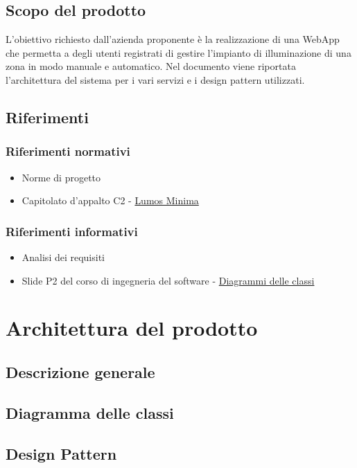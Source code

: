 \documentclass[12pt]{article}
\begin{document}
\subsection{Scopo del prodotto}
L'obiettivo richiesto dall'azienda proponente è la realizzazione di una WebApp che permetta a degli utenti registrati di gestire l'impianto di illuminazione
di una zona in modo manuale e automatico. Nel documento viene riportata l'architettura del sistema per i vari servizi e i design pattern utilizzati.

\subsection{Riferimenti}
\subsubsection{Riferimenti normativi}
\begin{itemize}
	\item Norme di progetto
	\item Capitolato d'appalto C2 - \href{https://www.math.unipd.it/~tullio/IS-1/2022/Progetto/C2.pdf}{Lumos Minima}
\end{itemize}
\subsubsection{Riferimenti informativi}
\begin{itemize}
	\item Analisi dei requisiti
	\item Slide P2 del corso di ingegneria del software - \href{https://www.math.unipd.it/~rcardin/swea/2023/Diagrammi%20delle%20Classi.pdf}{Diagrammi delle classi}
\end{itemize}

\section{Architettura del prodotto}
\subsection{Descrizione generale}
\subsection{Diagramma delle classi}
\subsection{Design Pattern}
\end{document}

